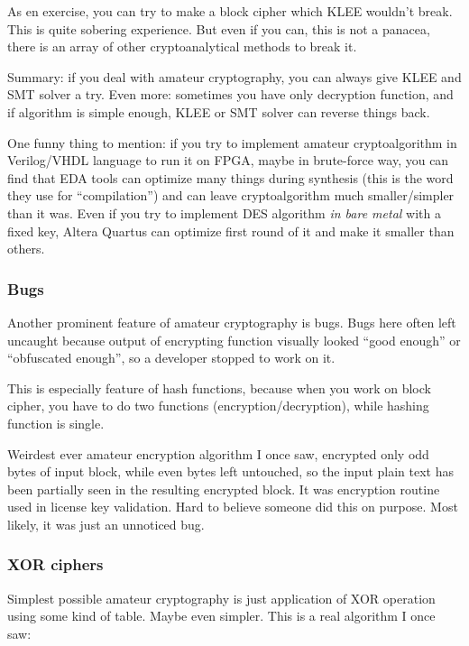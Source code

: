 As en exercise, you can try to make a block cipher which KLEE wouldn't break.
This is quite sobering experience.
But even if you can, this is not a panacea, there is an array of other cryptoanalytical methods to break it.

Summary: if you deal with amateur cryptography, you can always give KLEE and SMT solver a try.
Even more: sometimes you have only decryption function, and if algorithm is simple enough,
KLEE or SMT solver can reverse things back.

One funny thing to mention: if you try to implement amateur cryptoalgorithm in Verilog/VHDL language to run it on \ac{FPGA},
maybe in brute-force way,
you can find that \ac{EDA} tools can optimize many things during synthesis
(this is the word they use for ``compilation'') and can leave cryptoalgorithm much smaller/simpler than it was.
Even if you try to implement \ac{DES} algorithm \textit{in bare metal} with a fixed key,
Altera Quartus can optimize first round of it and make it smaller than others.

\subsubsection{Bugs}

Another prominent feature of amateur cryptography is bugs.
Bugs here often left uncaught because output of encrypting function visually looked ``good enough'' or ``obfuscated enough'',
so a developer stopped to work on it.

This is especially feature of hash functions, because when you work on block cipher, you have to do two functions
(encryption/decryption), while hashing function is single.

Weirdest ever amateur encryption algorithm I once saw, encrypted only odd bytes of input block, while even bytes
left untouched, so the input plain text has been partially seen in the resulting encrypted block.
It was encryption routine used in license key validation.
Hard to believe someone did this on purpose.
Most likely, it was just an unnoticed bug.

\subsubsection{XOR ciphers}

Simplest possible amateur cryptography is just application of XOR operation using some kind of table.
Maybe even simpler. This is a real algorithm I once saw:

